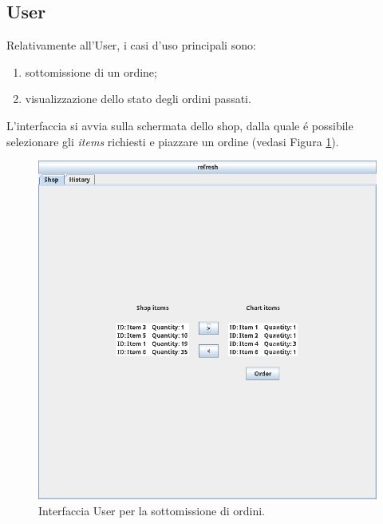 \subsection{User}
Relativamente all'User, i casi d'uso principali sono:
\begin{enumerate}
    \item sottomissione di un ordine;
    \item visualizzazione dello stato degli ordini passati.
\end{enumerate}
L'interfaccia si avvia sulla schermata dello shop, dalla quale \'e possibile selezionare gli \textit{items} richiesti e piazzare un ordine (vedasi Figura \ref{fig:application-shop}).
\begin{figure}[!ht]\centering
    \includegraphics[width=.75\textwidth]{section/usage_examples/figure/application-shop.png}
    \caption{Interfaccia User per la sottomissione di ordini.}
    \label{fig:application-shop}
\end{figure}

